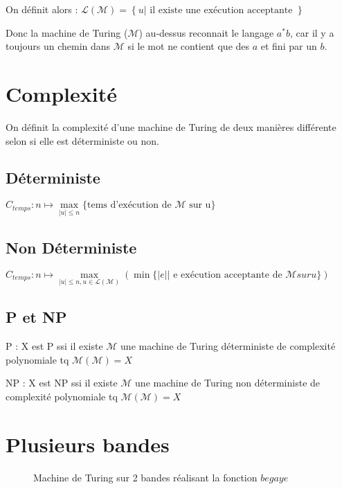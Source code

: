 \documentclass{article}
\theoremstyle{plain}
\theoremstyle{nonumberplain}
\begin{document}
  On définit alors :
  $\mathcal{L}(\mathcal{M}) = \left\{u | \text{ il existe une exécution acceptante }\right\}$

  Donc la machine de Turing ($\mathcal{M}$) au-dessus reconnait le langage $a^*b$, car 
  il y a toujours un chemin dans $\mathcal{M}$ si le mot ne contient que des $a$ et 
  fini par un $b$.

\section{Complexité}

On définit la complexité d'une machine de Turing de deux manières différente
selon si elle est déterministe ou non.

\subsection{Déterministe}

$C_{temps}: n \mapsto \underset{|u| \leq n}{\max} \{
  \text{tems d'exécution de $\mathcal{M}$ sur u}\}$

\subsection{Non Déterministe}

$C_{temps}: n \mapsto \underset{|u| \leq n, u \in \mathcal{L(\mathcal{M})}}{\max}
                    (\min \{|e| | \text{ e exécution 
                                      acceptante de $\mathcal{M} sur u$}\})$

\subsection{P et NP}

P : X est P ssi il existe $\mathcal{M}$ une machine de Turing déterministe de 
    complexité polynomiale tq $\mathcal{M}(\mathcal{M}) = X$

NP : X est NP ssi il existe $\mathcal{M}$ une machine de Turing non déterministe de 
    complexité polynomiale tq $\mathcal{M}(\mathcal{M}) = X$

\newpage
\section{Plusieurs bandes}

\begin{figure}[!htb]
  \center
  \caption{Machine de Turing sur 2 bandes réalisant la fonction $begaye$}
\end{figure}
\end{document}
